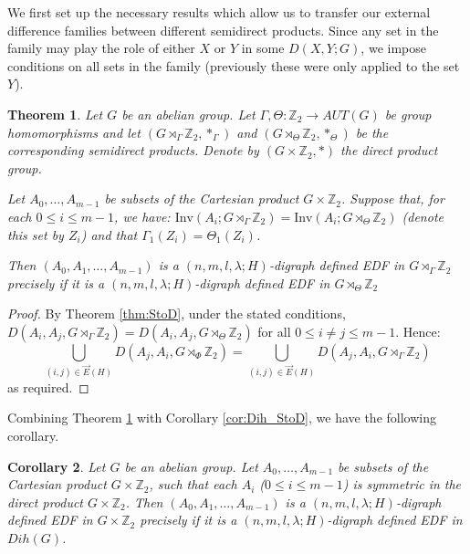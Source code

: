 \documentclass[12pt, a4paper]{article}
\newtheorem{theorem}{Theorem}[section]
\newtheorem{corollary}[theorem]{Corollary}
\theoremstyle{definition}
\newcommand{\E}{\overrightarrow{E}}
\begin{document}
We first set up the necessary results which allow us to transfer our external difference families between different semidirect products.  Since any set in the family may play the role of either $X$ or $Y$ in some $D(X,Y;G)$, we impose conditions on all sets in the family (previously these were only applied to the set $Y$).


\begin{theorem}\label{thm:SD_digraphEDF}
Let $G$ be an abelian group. Let $\Gamma, \Theta: \mathbb{Z}_2 \rightarrow AUT(G)$ be group homomorphisms and let $(G \rtimes_{\Gamma} \mathbb{Z}_2,*_{\Gamma})$ and $(G \rtimes_{\Theta} \mathbb{Z}_2,*_{\Theta})$ be the corresponding semidirect products. Denote by $(G \times \mathbb{Z}_2,*)$ the direct product group. 

Let $A_0,\ldots, A_{m-1}$ be subsets of the Cartesian product $G \times \mathbb{Z}_2$.  Suppose that, for each $0 \leq i \leq m-1$, we have: $\mathrm{Inv}(A_i;G \rtimes_{\Gamma} \mathbb{Z}_2)=\mathrm{Inv}(A_i;G \rtimes_{\Theta} \mathbb{Z}_2)$ (denote this set by $Z_i$) and that $\Gamma_1(Z_i)=\Theta_1(Z_i)$. 

Then $(A_0,A_1,\ldots, A_{m-1})$ is a $(n,m,l,\lambda; H)$-digraph defined EDF in $G\rtimes_{\Gamma} \mathbb{Z}_2$ precisely if it is a $(n,m,l,\lambda; H)$-digraph defined EDF in $G\rtimes_{\Theta} \mathbb{Z}_2$
\end{theorem}
\begin{proof}
By Theorem \ref{thm:StoD}, under the stated conditions,
$D(A_i,A_j,G\rtimes_{\Gamma}\mathbb{Z}_2)=D(A_i,A_j,G\rtimes_{\Theta}\mathbb{Z}_2)$ for all $0 \leq i \neq j \leq m-1$.
Hence:
\[
\bigcup_{(i,j) \in \E(H)}D(A_{j},A_i,G\rtimes_\Phi\mathbb{Z}_2)=\bigcup_{(i,j) \in \E(H)}D(A_{j},A_i,G\rtimes_{\Gamma} \mathbb{Z}_2)
\]
as required.
\end{proof}

Combining Theorem \ref{thm:SD_digraphEDF} with Corollary \ref{cor:Dih_StoD}, we have the following corollary.
\begin{corollary}\label{cor:symmDigDefEDF}
Let $G$ be an abelian group.  Let $A_0,\ldots, A_{m-1}$ be subsets of the Cartesian product $G \times \mathbb{Z}_2$, such that each $A_i$ ($0 \leq i \leq m-1$) is symmetric in the direct product $G \times \mathbb{Z}_2$. 
Then $(A_0,A_1,\ldots, A_{m-1})$ is a $(n,m,l,\lambda; H)$-digraph defined EDF in $G\times \mathbb{Z}_2$ precisely if it is a $(n,m,l,\lambda; H)$-digraph defined EDF in $Dih(G)$.
\end{corollary}
\end{document}
